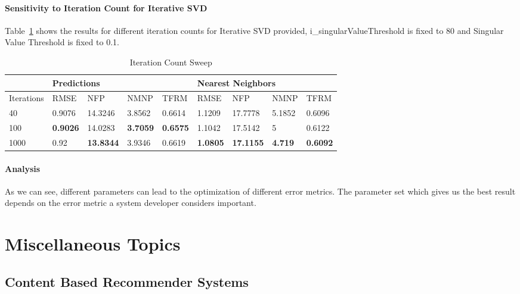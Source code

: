 \begin{enumerate}
\paragraph{Sensitivity to Iteration Count for Iterative SVD}
Table~\ref{tab:IterationCountSweep} shows the results for different iteration counts for Iterative SVD provided, i\_singularValueThreshold is fixed to 80 and Singular Value Threshold is fixed to 0.1.
\begin{table}[]
\centering
\caption{Iteration Count Sweep}
\label{tab:IterationCountSweep}
\begin{tabular}{|l|l|l|l|l|l|l|l|l|}
\hline
           & \multicolumn{4}{l|}{Predictions}   & \multicolumn{4}{l|}{Nearest Neighbors} \\ \hline
Iterations & RMSE   & NFP     & NMNP   & TFRM   & RMSE    & NFP      & NMNP    & TFRM    \\ \hline
40         & 0.9076 & 14.3246 & 3.8562 & 0.6614 & 1.1209  & 17.7778  & 5.1852  & 0.6096  \\ \hline
100        & \textbf{0.9026} & 14.0283 & \textbf{3.7059} & \textbf{0.6575} & 1.1042  & 17.5142  & 5       & 0.6122  \\ \hline
1000       & 0.92   & \textbf{13.8344} & 3.9346 & 0.6619 & \textbf{1.0805}  & \textbf{17.1155}  & \textbf{4.719}   & \textbf{0.6092}  \\ \hline
\end{tabular}
\end{table}

\paragraph{Analysis}
As we can see, different parameters can lead to the optimization of different error metrics. The parameter set which gives us the best result depends on the error metric a system developer considers important.

  \section{Miscellaneous Topics}
  \subsection{Content Based Recommender Systems}


\end{enumerate}
